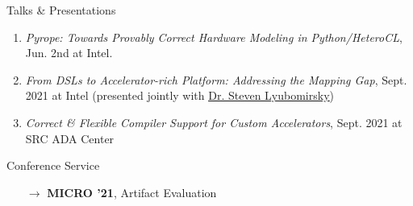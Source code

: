 \documentclass{resume}
\newcommand{\myul}[2][blue]{\setulcolor{#1}\ul{#2}\setulcolor{blue}}
\begin{document}
	\begin{rSection}{Talks \& Presentations}
		\vspace{-5pt}
		\begin{enumerate}
			\setlength{\itemsep}{1pt}
			\setlength{\parskip}{0pt}
			\setlength{\parsep}{0pt}
            \item \textit{Pyrope: Towards Provably Correct Hardware Modeling in Python/HeteroCL}, Jun. 2nd at Intel.
			\item \textit{From DSLs to Accelerator-rich Platform: Addressing the Mapping Gap}, Sept. 2021 at Intel (presented jointly with \href{https://homes.cs.washington.edu/~sslyu/}{\color{blue} \myul {Dr. Steven Lyubomirsky}})
			\item \textit{Correct \& Flexible Compiler Support for Custom Accelerators}, Sept. 2021 at SRC ADA Center
		\end{enumerate} 
	\end{rSection}
	\vspace{-5pt}
	\begin{rSection}{Conference Service}
    	\begin{enumerate}
    		\setlength{\itemsep}{1pt}
            \setlength{\parskip}{0pt}
    		\setlength{\parsep}{0pt}
    		\item[$\rightarrow$] \textbf{MICRO '21}, Artifact Evaluation
    	\end{enumerate}
	\end{rSection}
\end{document}
